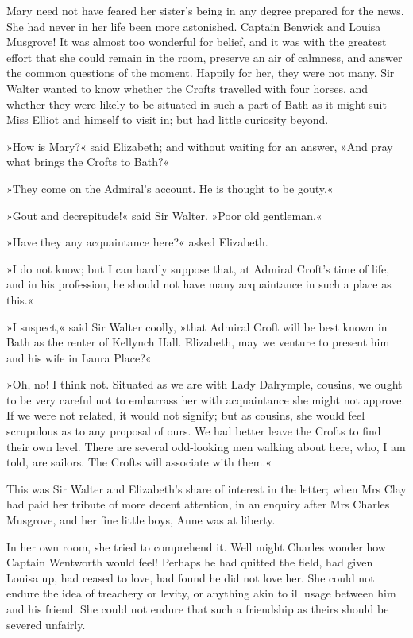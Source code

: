 Mary need not have feared her sister's being in any degree prepared for the news. She had never in her life been more astonished. Captain Benwick and Louisa Musgrove! It was almost too wonderful for belief, and it was with the greatest effort that she could remain in the room, preserve an air of calmness, and answer the common questions of the moment. Happily for her, they were not many. Sir Walter wanted to know whether the Crofts travelled with four horses, and whether they were likely to be situated in such a part of Bath as it might suit Miss Elliot and himself to visit in; but had little curiosity beyond.

»How is Mary?« said Elizabeth; and without waiting for an answer, »And pray what brings the Crofts to Bath?«

»They come on the Admiral's account. He is thought to be gouty.«

»Gout and decrepitude!« said Sir Walter. »Poor old gentleman.«

»Have they any acquaintance here?« asked Elizabeth.

»I do not know; but I can hardly suppose that, at Admiral Croft's time of life, and in his profession, he should not have many acquaintance in such a place as this.«

»I suspect,« said Sir Walter coolly, »that Admiral Croft will be best known in Bath as the renter of Kellynch Hall. Elizabeth, may we venture to present him and his wife in Laura Place?«

»Oh, no! I think not. Situated as we are with Lady Dalrymple, cousins, we ought to be very careful not to embarrass her with acquaintance she might not approve. If we were not related, it would not signify; but as cousins, she would feel scrupulous as to any proposal of ours. We had better leave the Crofts to find their own level. There are several odd-looking men walking about here, who, I am told, are sailors. The Crofts will associate with them.«

This was Sir Walter and Elizabeth's share of interest in the letter; when Mrs Clay had paid her tribute of more decent attention, in an enquiry after Mrs Charles Musgrove, and her fine little boys, Anne was at liberty.

In her own room, she tried to comprehend it. Well might Charles wonder how Captain Wentworth would feel! Perhaps he had quitted the field, had given Louisa up, had ceased to love, had found he did not love her. She could not endure the idea of treachery or levity, or anything akin to ill usage between him and his friend. She could not endure that such a friendship as theirs should be severed unfairly.

